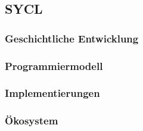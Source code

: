 \subsection{SYCL}

\subsubsection{Geschichtliche Entwicklung}

\subsubsection{Programmiermodell}

\subsubsection{Implementierungen}

\subsubsection{Ökosystem}
